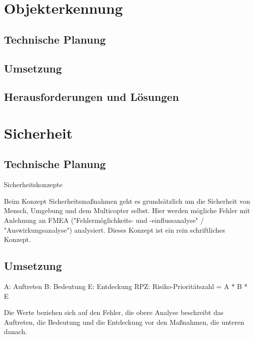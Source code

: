 \section{Objekterkennung}

  \subsection{Technische Planung}

  \subsection{Umsetzung}

  \subsection{Herausforderungen und Lösungen}

\section{Sicherheit}

  \subsection{Technische Planung}

Sicherheitskonzepte

Beim Konzept Sicherheitsmaßnahmen geht es grundsätzlich um die Sicherheit von Mensch, Umgebung und dem Multicopter selbst. Hier werden mögliche Fehler mit Anlehnung an FMEA ("Fehlermöglichkeits- und -einflussanalyse" / "Auswirkungsanalyse") analysiert. Dieses Konzept ist ein rein schriftliches Konzept.

  \subsection{Umsetzung}

A: Auftreten
B: Bedeutung
E: Entdeckung
RPZ: Risiko-Prioritätszahl = A * B * E

Die Werte beziehen sich auf den Fehler, die obere Analyse beschreibt das Auftreten, die Bedeutung und die Entdeckung vor den Maßnahmen, die unteren danach.

